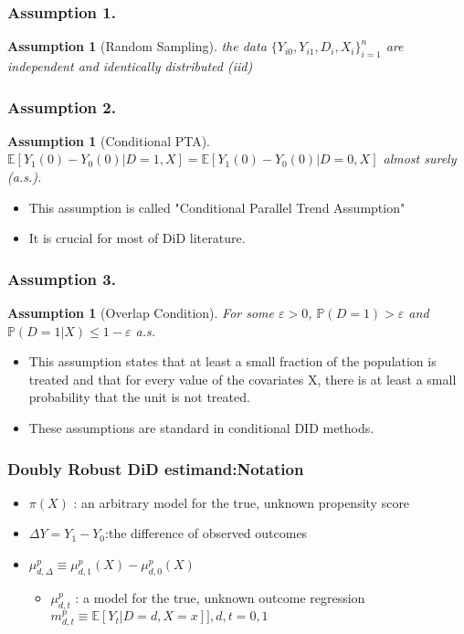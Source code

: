 \documentclass{beamer}
\newtheorem{assumption}[thm]{Assumption}
\begin{document}
\begin{frame}\frametitle{Assumption 1.}
    \begin{assumption}[Random Sampling]
        the data $\{Y_{i0}, Y_{i1}, D_{i}, X_{i}\}^{n}_{i = 1}$ are independent and identically distributed (iid)
    \end{assumption}
\end{frame}

\begin{frame}\frametitle{Assumption 2.}
    \begin{assumption}[Conditional PTA]
        $\mathbb{E}[Y_{1}(0) - Y_{0}(0)| D = 1, X] = \mathbb{E}[Y_{1}(0) - Y_{0}(0)|D = 0, X]$ almost surely (a.s.).
    \end{assumption}
    \begin{itemize}
        \item This assumption is called "Conditional Parallel Trend Assumption"
        \item It is crucial for most of DiD literature.
    \end{itemize}
\end{frame}

\begin{frame}\frametitle{Assumption 3.}
    \begin{assumption}[Overlap Condition]
        For some $\varepsilon > 0$, $\mathbb{P}(D = 1) > \varepsilon$ and $\mathbb{P}(D = 1|X) \leq 1 - \varepsilon$ a.s.
    \end{assumption}
    \begin{itemize}
        \item This assumption states that at least a small fraction of the population is treated and that for every value of the covariates X, there is at least a small probability that the unit is not treated.
        \item These assumptions are standard in conditional DID methods.
    \end{itemize}
\end{frame}

\begin{frame}\frametitle{Doubly Robust DiD estimand:Notation}
    \begin{itemize}
        \item $\pi(X)$ : an arbitrary model for the true, unknown propensity score
        \item $\Delta Y = Y_{1} - Y_{0}$:the difference of observed outcomes
        \item $\mu ^{p}_{d,\Delta} \equiv \mu ^{p}_{d,1}(X) - \mu ^{p}_{d,0}(X)$
        \begin{itemize}
            \item $\mu ^{p}_{d,t}$ : a model for the true, unknown outcome regression $m^{p}_{d,t} \equiv \mathbb{E}[Y_{t}|D = d, X = x]],d,t = 0,1$
        \end{itemize}
    \end{itemize}
\end{frame}
\end{document}

